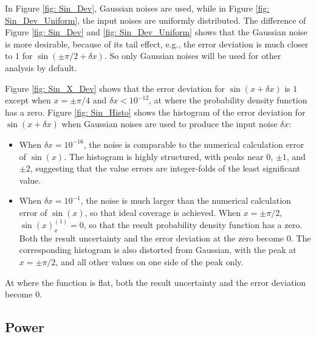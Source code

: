 \documentclass[twoside]{article}
\numberwithin{equation}{section}
\begin{document}
In Figure \ref{fig: Sin_Dev}, Gaussian noises are used, while in Figure \ref{fig: Sin_Dev_Uniform}, the input noises are uniformly distributed.
The difference of Figure \ref{fig: Sin_Dev} and \ref{fig: Sin_Dev_Uniform} shows that the Gaussian noise is more desirable, because of its tail effect, e.g., the error deviation is much closer to $1$ for $\sin(\pm \pi/2 + \delta x)$.
So only Gaussian noises will be used for other analysis by default.

Figure \ref{fig: Sin_X_Dev} shows that the error deviation for $\sin(x + \delta x)$ is $1$ except when $x=\pm \pi/4$ and $\delta x < 10^{-12}$, at where the probability density function has a zero.
Figure \ref{fig: Sin_Histo} shows the histogram of the error deviation for $\sin(x + \delta x)$ when Gaussian noises are used to produce the input noise $\delta x$:
\begin{itemize}
\item When $\delta x=10^{-16}$, the noise is comparable to the numerical calculation error of $\sin(x)$.
The histogram is highly structured, with peaks near $0$, $\pm 1$, and $\pm 2$, suggesting that the value errors are integer-folds of the least significant value.

\item When $\delta x=10^{-1}$, the noise is much larger than the numerical calculation error of $\sin(x)$, so that ideal coverage is achieved.
When $x=\pm \pi/2$, $\sin(x)^{(1)}_{x} = 0$, so that the result probability density function has a zero.
Both the result uncertainty and the error deviation at the zero become $0$.
The  corresponding histogram is also distorted from Gaussian, with the peak at $x=\pm \pi/2$, and all other values on one side of the peak only.

\end{itemize}
At where the function is flat, both the result uncertainty and the error deviation become $0$.


\subsection{Power}
\end{document}
